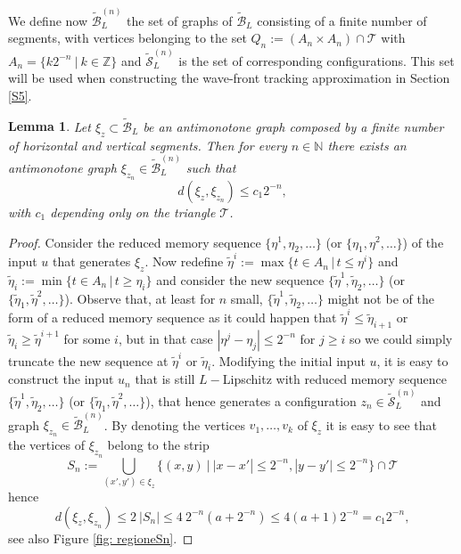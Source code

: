 \documentclass[12pt]{article}
\newcommand{\N}{\mathbb{N}}
\newcommand{\Z}{\mathbb{Z}}
\newcommand{\T}{\mathcal{T}}
\newcommand{\1}{\mathds{1}}
\newtheorem{lem}[teo]{Lemma}
\theoremstyle{definition}
\begin{document}
We define now $\tilde{\mathcal B}_L^{(n)}$ the set of graphs of $\tilde{\mathcal B}_L$ consisting of a finite number of segments, with vertices belonging to the set $Q_n:=(A_n\times A_n) \cap \T$ with $A_n=\{k 2^{-n} ~|~k\in \Z\}$ and $\tilde{\mathcal S}_L^{(n)}$ is the set of corresponding configurations. This set will be used when constructing the wave-front tracking approximation in Section \ref{S5}. 

\begin{lem}\label{lemma: propPreis4}
    Let $\xi_z\subset \tilde{\mathcal B}_L$ be an antimonotone graph composed by a finite number of horizontal and vertical segments. Then for every $n\in\N$ there exists an antimonotone graph $\xi_{z_n} \in \tilde{\mathcal B}_L^{(n)}$ such that \begin{equation}
        d(\xi_z,\xi_{z_n})\leq c_1 2^{-n},
    \end{equation} with $c_1$ depending only on the triangle $\T$. 
\end{lem}
\begin{proof}
    Consider the reduced memory sequence $\{\eta^1,\eta_2,\dots\}$ (or $\{\eta_1,\eta^2,\dots\}$) of the input $u$ that generates $\xi_z$. Now redefine $\tilde{\eta}^i:=\max\{ t \in A_n\,|\, t\leq \eta^i\}$ and $\tilde{\eta}_i:=\min\{ t \in A_n\,|\, t\geq \eta_i\}$ and consider the new sequence $\{\tilde{\eta}^1,\tilde{\eta}_2,\dots\}$ (or $\{\tilde{\eta}_1,\tilde{\eta}^2,\dots\}$). Observe that, at least for $n$ small, $\{\tilde{\eta}^1,\tilde{\eta}_2,\dots\}$ might not be of the form of a reduced memory sequence as it could happen that $\tilde{\eta} ^{i} \leq \tilde{\eta} _{i+1}$ or $\tilde{\eta} _{i} \geq \tilde{\eta} ^{i+1}$ for some $i$, but in that case $|\eta ^j - \eta _j| \leq 2^{-n}$ for $j\geq i$ so we could simply truncate the new sequence at $\tilde{\eta}^i$ or $\tilde{\eta}_i$. Modifying the initial input $u$, it is easy to construct the input $u_n$ that is still $L-$Lipschitz with reduced memory sequence $\{\tilde{\eta}^1,\tilde{\eta}_2,\dots\}$ (or $\{\tilde{\eta}_1,\tilde{\eta}^2,\dots\}$), that hence generates a configuration $z_n \in \tilde{\mathcal S}_L^{(n)}$ and graph $\xi_{z_n}\in\tilde{\mathcal B}_L^{(n)}$. By denoting the vertices $v_1,\dots, v_k$ of $\xi_z$ it is easy to see that the vertices of $\xi_{z_n}$ belong to the strip \[ S_n := \bigcup_{(x',y')\in \xi_z} \{ (x,y) ~|~ |x-x'|\leq 2^{-n}, |y-y'|\leq 2^{-n}\}\cap \T\] hence \begin{equation*} d(\xi_z,\xi_{z_n})\leq 2~|S_n|\leq 4 ~ 2^{-n}(a+2^{-n}) \leq 4  (a+1) 2^{-n}=c_1 2^{-n},
    \end{equation*} see also Figure \ref{fig: regioneSn}.
\end{proof}
\end{document}
